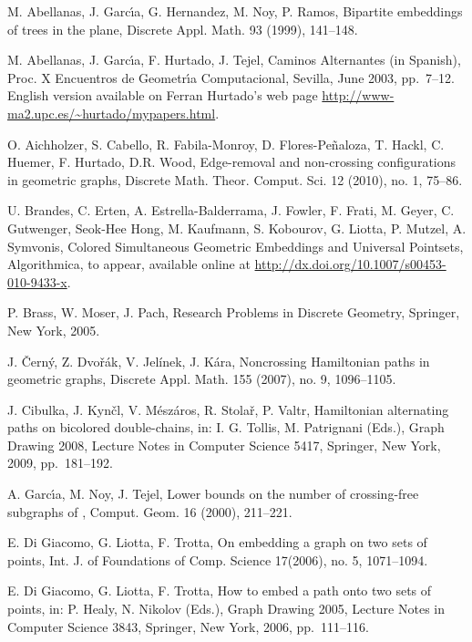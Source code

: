 \documentclass[12pt]{article}
\begin{document}
\begin{thebibliography}{ABC}

M. Abellanas, J. Garc{\'\i}a, G. Hernandez, M. Noy, P. Ramos, 
Bipartite embeddings of trees in the plane, 
Discrete Appl. Math. 93 (1999), 141--148.

M. Abellanas, J. Garc{\'\i}a, F. Hurtado, J. Tejel, Caminos Alternantes (in Spanish),
Proc. X Encuentros de Geometr{\'\i}a Computacional, Sevilla, June 2003, pp.\ 7--12. English version
available on Ferran Hurtado's web page \url{http://www-ma2.upc.es/~hurtado/mypapers.html}.

O. Aichholzer, S. Cabello, R. Fabila-Monroy, D. Flores-Pe\~{n}aloza, T. Hackl, C. Huemer, F. Hurtado, D.R. Wood,
Edge-removal and non-crossing configurations in geometric graphs,
Discrete Math. Theor. Comput. Sci. 12 (2010), no. 1, 75--86.

U. Brandes, C. Erten, A. Estrella-Balderrama, J. Fowler, F. Frati, M. Geyer, C. Gutwenger, Seok-Hee Hong, M. Kaufmann,
S. Kobourov, G. Liotta, P. Mutzel, A. Symvonis,
Colored Simultaneous Geometric Embeddings and Universal Pointsets,
Algorithmica, to appear, available online at \url{http://dx.doi.org/10.1007/s00453-010-9433-x}.


P. Brass, W. Moser, J. Pach, Research Problems in Discrete Geometry,
Springer, New York, 2005.

J. \v{C}ern\'y, Z. Dvo\v{r}\'ak, V. Jel\'inek, J. K\'ara,
Noncrossing Hamiltonian paths in geometric graphs,
Discrete Appl. Math. 155 (2007), no. 9, 1096--1105.

J. Cibulka, J. Kyn\v{c}l, V. M\'{e}sz\'{a}ros, R. Stola\v{r}, P. Valtr,  
Hamiltonian alternating paths on bicolored double-chains,
in: I. G. Tollis, M. Patrignani (Eds.), Graph Drawing 2008, Lecture Notes in Computer Science 5417,
Springer, New York, 2009, pp.\ 181--192.

A. Garc{\'\i}a, M. Noy, J. Tejel,
Lower bounds on the number of crossing-free subgraphs of ,
Comput. Geom. 16 (2000), 211--221.

E. Di Giacomo, G. Liotta, F. Trotta,
On embedding a graph on two sets of points,
Int. J. of Foundations of Comp. Science 17(2006), no. 5, 1071--1094.

E. Di Giacomo, G. Liotta, F. Trotta,
How to embed a path onto two sets of points,
in: P. Healy, N. Nikolov (Eds.), Graph Drawing 2005, Lecture Notes in Computer Science 3843,
Springer, New York, 2006, pp.\ 111--116.


\end{thebibliography}
\end{document}
